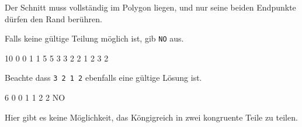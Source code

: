\documentclass{boi2014-de}
\newcommand{\constant}[1]{{\tt #1}}
\begin{document}
    Der Schnitt muss vollständig im Polygon liegen, und nur seine beiden Endpunkte dürfen den Rand berühren.

    Falls keine gültige Teilung möglich ist, gib \constant{NO} aus.

    \clearpage

    \Examples
	\example
	{
		10  0  0  1  1  5  5  3  3  2  2
	}
	{
		1 2 3 2
	}
	{
        Beachte dass {\tt 3 2 1 2} ebenfalls eine gültige Lösung ist.

        \begin{center}
        \end{center}
    }

    \example
    {
        6  0  0  1  1  2  2
    }
    {
        NO
    }
    {
        Hier gibt es keine Möglichkeit, das Köngigreich in zwei kongruente Teile zu teilen.
        \begin{center}
        \end{center}
    }

    \Scoring
\end{document}
